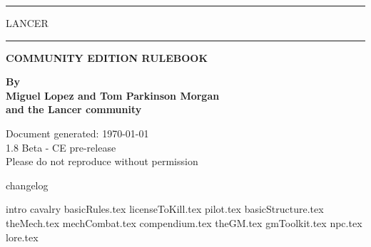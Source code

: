 \documentclass[11pt, letterpaper, openany]{memoir}
\makeatletter
\renewcommand\mainmatter{%
     \clearpage
   \@mainmattertrue
   \pagenumbering{arabic}}
\makeatother
\begin{document}
\begin{center}
\rule[1cm]{0.78\textwidth}{3mm}
{\fontsize{96}{115}\selectfont LANCER}
\rule[-1cm]{0.78\textwidth}{3mm}

\vspace{2cm}
\huge\textbf{COMMUNITY EDITION RULEBOOK}

\vspace{4cm}
\normalsize\textbf{By} \\
\textbf{Miguel Lopez and Tom Parkinson Morgan}\\
\textbf{and the Lancer community}\\

\vspace{2cm}
\date{} %
Document generated: \today \\

\vspace{1cm}
1.8 Beta - CE pre-release\\
Please do not reproduce without permission
\clearpage
\end{center}

{changelog}
\clearpage

\tableofcontents
\endgroup %
\mainmatter
\pagestyle{plain}
\addtocounter{page}{12}

{intro} 
{cavalry}
{basicRules.tex}
{licenseToKill.tex}
{pilot.tex}
{basicStructure.tex}
{theMech.tex}
{mechCombat.tex}
{compendium.tex}
{theGM.tex}
{gmToolkit.tex}
{npc.tex}
{lore.tex}
\end{document}
